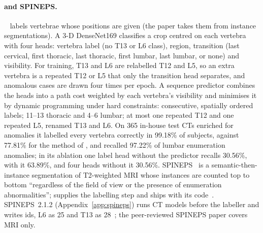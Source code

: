 \paragraph{\VERIDAH{} and SPINEPS.}
\VERIDAH{}~\citep{Moller2026VERIDAH:Sequences} labels vertebrae whose positions are given
(the paper takes them from instance segmentations). A 3-D DenseNet169 classifies a crop
centred on each vertebra with four heads: vertebra label (no T13 or L6 class), region,
transition (last cervical, first thoracic, last thoracic, first lumbar, last lumbar, or none)
and visibility. For training, T13 and L6 are relabelled T12 and L5, so an extra vertebra is a repeated T12 or L5 that only the transition
head separates, and anomalous cases are drawn four times per epoch. A sequence predictor
combines the heads into a path cost weighted by each vertebra's visibility and minimises it by
dynamic programming under hard constraints: consecutive, spatially ordered labels; 11--13
thoracic and 4--6 lumbar; at most one repeated T12 and one repeated L5, renamed T13 and L6.
On 365 in-house test CTs enriched for anomalies it labelled every vertebra correctly in
99.18\% of subjects, against 77.81\% for the method of \citet{Meng2022VertebraeMLMI}, and
recalled 97.22\% of lumbar enumeration anomalies; in its ablation one label head without the
predictor recalls 30.56\%, with it 63.89\%, and four heads without it 30.56\%.
SPINEPS~\citep{Moller2024SPINEPSautomaticSegmentation} is a semantic-then-instance
segmentation of T2-weighted MRI whose instances are counted top to bottom ``regardless of the
field of view or the presence of enumeration abnormalities''; \VERIDAH{} supplies the
labelling step and ships with its code~\citep{Moller2026VERIDAH:Sequences}. SPINEPS~2.1.2
(Appendix~\ref{app:spineps}) runs CT models before the \VERIDAH{} labeller and writes \VerSe{}
ids, L6 as 25 and T13 as 28~\citep{MollerSPINEPSSoftware}; the peer-reviewed SPINEPS paper
covers MRI only.

